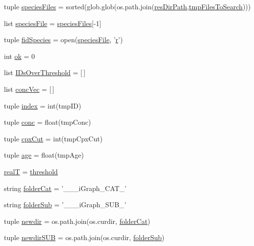 \begin{DoxyCompactItemize}
\item 
tuple \hyperlink{a00096_a4f47408478e9a0590d016df50cf42141}{species\-Files} = sorted(glob.\-glob(os.\-path.\-join(\hyperlink{a00096_a9ededb3cd7c63befde39ad68e5f9e006}{res\-Dir\-Path},\hyperlink{a00096_a141356fc914110fdf3ec4f0fc3beaab5}{tmp\-Files\-To\-Search})))
\item 
list \hyperlink{a00096_a1d066fa24dced2da12ffd9a8514a17ba}{species\-File} = \hyperlink{a00096_a4f47408478e9a0590d016df50cf42141}{species\-Files}\mbox{[}-\/1\mbox{]}
\item 
tuple \hyperlink{a00096_aba2f982879776e057b35971b3653549e}{fid\-Species} = open(\hyperlink{a00096_a1d066fa24dced2da12ffd9a8514a17ba}{species\-File}, '\hyperlink{a00025_ac862e7284527eb913b1351c8bfb8e079}{r}')
\item 
int \hyperlink{a00096_a9ce833d782f17d858941cfa76914599a}{ok} = 0
\item 
list \hyperlink{a00096_a578f0f0f1e87579d73b11f8720610b1e}{I\-Ds\-Over\-Threshold} = \mbox{[}$\,$\mbox{]}
\item 
list \hyperlink{a00096_a1681853ab5f5859e51f219caa07a8539}{conc\-Vec} = \mbox{[}$\,$\mbox{]}
\item 
tuple \hyperlink{a00096_aaac3bb67a998c4a09aeed8f1adec2f9c}{index} = int(tmp\-I\-D)
\item 
tuple \hyperlink{a00096_a6ec435b19c74f79f32a0eae7bb2bd1c8}{conc} = float(tmp\-Conc)
\item 
tuple \hyperlink{a00096_a06673ec4592e44a89a443073b8a29011}{cpx\-Cut} = int(tmp\-Cpx\-Cut)
\item 
tuple \hyperlink{a00096_a98baad82b74a27e8b8c58aa985b7d374}{age} = float(tmp\-Age)
\item 
\hyperlink{a00096_a1c9b45f6074222ace96b7ab38cb8e23b}{real\-T} = \hyperlink{a00030_aa022cbb28f80299d572def08e7a5ccfd}{threshold}
\item 
string \hyperlink{a00096_a1cbfd083273176eebfe0260e8384acef}{folder\-Cat} = '\-\_\-\-\_\-\_\-i\-Graph\-\_\-\-C\-A\-T\-\_\-'
\item 
string \hyperlink{a00096_a90c2bcabbdb271c2c3347ebea4c259bc}{folder\-Sub} = '\-\_\-\-\_\-\_\-i\-Graph\-\_\-\-S\-U\-B\-\_\-'
\item 
tuple \hyperlink{a00096_a440179ca1c764cabcf9181985ae5dfb8}{newdir} = os.\-path.\-join(os.\-curdir, \hyperlink{a00096_a1cbfd083273176eebfe0260e8384acef}{folder\-Cat})
\item 
tuple \hyperlink{a00096_adb3b62d0896774bc87adfee19d047aa8}{newdir\-S\-U\-B} = os.\-path.\-join(os.\-curdir, \hyperlink{a00096_a90c2bcabbdb271c2c3347ebea4c259bc}{folder\-Sub})

\end{DoxyCompactItemize}

